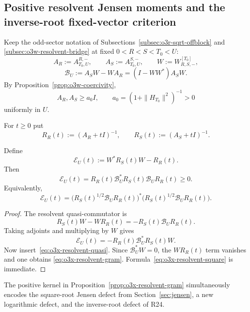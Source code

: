 
\subsection{Positive resolvent Jensen moments and the inverse-root fixed-vector criterion}
\label{subsec:o3x-resolvent-jensen}

Keep the odd-sector notation of Subsections~\ref{subsec:o3r-sqrt-offblock} and
\ref{subsec:o3w-resolvent-bridge} at fixed $0<R<S<T_0<U$:
\[
 A_R:=A_{T_0,U}^{R,-},
 \qquad
 A_S:=A_{T_0,U}^{S,-},
 \qquad
 W:=W_{R,S,-}^{[T_0]},
\]
\[
 \mathscr B_U:=A_SW-WA_R=(I-WW^*)A_SW.
\]
By Proposition~\ref{prop:o3w-coercivity},
\[
 A_R,A_S\ge a_0I,
 \qquad
 a_0=(1+\|H_{T_0}\|^2)^{-1}>0
\tag{O3X.1}\label{eq:o3x-a0}
\]
uniformly in $U$.

For $t\ge0$ put
\[
 R_R(t):=(A_R+tI)^{-1},
 \qquad
 R_S(t):=(A_S+tI)^{-1}.
\]

\begin{proposition}
\label{prop:o3x-resolvent-gram}
Define
\[
 \mathscr E_U(t):=W^*R_S(t)W-R_R(t).
\]
Then
\[
 \boxed{
 \mathscr E_U(t)
 =R_R(t)\mathscr B_U^*R_S(t)\mathscr B_UR_R(t)
 \ge0.
 }
\tag{O3X.2}\label{eq:o3x-resolvent-gram}
\]
Equivalently,
\[
 \boxed{
 \mathscr E_U(t)
 =\bigl(R_S(t)^{1/2}\mathscr B_UR_R(t)\bigr)^*
  \bigl(R_S(t)^{1/2}\mathscr B_UR_R(t)\bigr).
 }
\tag{O3X.3}\label{eq:o3x-resolvent-square}
\]
\end{proposition}

\begin{proof}
The resolvent quasi-commutator is
\[
 R_S(t)W-WR_R(t)
 =-R_S(t)\mathscr B_UR_R(t).
\tag{O3X.4}\label{eq:o3x-resolvent-quasi}
\]
Taking adjoints and multiplying by $W$ gives
\[
 \mathscr E_U(t)
 =-R_R(t)\mathscr B_U^*R_S(t)W.
\]
Now insert~\eqref{eq:o3x-resolvent-quasi}.  Since
$\mathscr B_U^*W=0$, the $WR_R(t)$ term vanishes and one obtains
\eqref{eq:o3x-resolvent-gram}.  Formula~\eqref{eq:o3x-resolvent-square}
is immediate.
\end{proof}

The positive kernel in Proposition~\ref{prop:o3x-resolvent-gram} simultaneously
encodes the square-root Jensen defect from Section~\ref{sec:jensen}, a new logarithmic
defect, and the inverse-root defect of R24.

